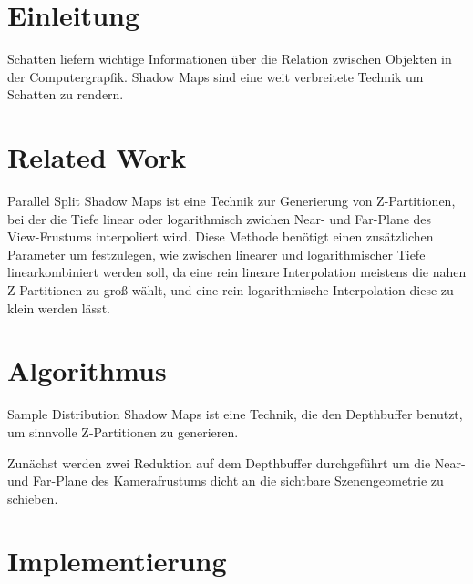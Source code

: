 \documentclass[runningheads]{llncs}
\begin{document}
\section{Einleitung}

Schatten liefern wichtige Informationen über die Relation zwischen Objekten in der Computergrapfik.
Shadow Maps sind eine weit verbreitete Technik um Schatten zu rendern.



\section{Related Work}

Parallel Split Shadow Maps ist eine Technik zur Generierung von Z-Partitionen, bei der die Tiefe linear oder logarithmisch zwichen Near- und Far-Plane des View-Frustums interpoliert wird. Diese Methode benötigt einen zusätzlichen Parameter um festzulegen, wie zwischen linearer und logarithmischer Tiefe linearkombiniert werden soll, da eine rein lineare Interpolation meistens die nahen Z-Partitionen zu groß wählt, und eine rein logarithmische Interpolation diese zu klein werden lässt.


\section{Algorithmus}

Sample Distribution Shadow Maps ist eine Technik, die den Depthbuffer benutzt, um sinnvolle Z-Partitionen zu generieren.


Zunächst werden zwei Reduktion auf dem Depthbuffer durchgeführt um die Near- und Far-Plane des Kamerafrustums dicht an die sichtbare Szenengeometrie zu schieben.



\section{Implementierung}
\end{document}
